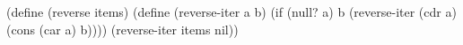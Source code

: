 \begtt\scm
(define (reverse items)
  (define (reverse-iter a b)
    (if (null? a)
        b
        (reverse-iter (cdr a) (cons (car a) b))))
  (reverse-iter items nil))
\endtt
